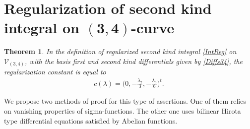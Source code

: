 \documentclass[pdftex]{sigma}
\numberwithin{equation}{section}
\newtheorem{Theorem}{Theorem}[section]
\begin{document}
\section[Regularization of second kind integral on $(3,4)$-curve]{Regularization of second kind integral on $\boldsymbol{(3,4)}$-curve}\label{s:Reg34}
\begin{Theorem}\label{T:Reg34}
In the definition of regularized second kind integral \eqref{IntReg} on $\mathcal{V}_{(3,4)}$, with the basis first and second kind differentials given by \eqref{Diffs34}, the regularization constant is equal to
 \begin{gather}\label{C34const}
 c(\lambda) = \bigg(0, -\frac{\lambda_2}{3}, {-}\frac{\lambda_5}{6} \bigg)^t.
\end{gather}
\end{Theorem}
We propose two methods of proof for this type of assertions. One of them relies on vanishing properties of sigma-functions. The other one uses bilinear Hirota type differential equations satisfied by Abelian functions.
\end{document}
